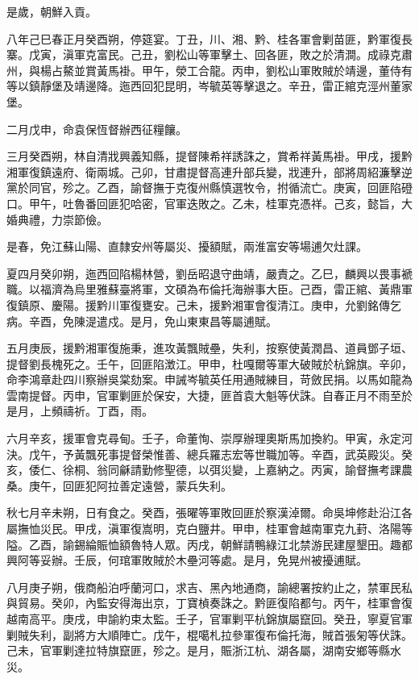 \begin{pinyinscope}
是歲，朝鮮入貢。

八年己巳春正月癸酉朔，停筵宴。丁丑，川、湘、黔、桂各軍會剿苗匪，黔軍復長寨。戊寅，滇軍克富民。己丑，劉松山等軍擊土、回各匪，敗之於清澗。成祿克肅州，與楊占鰲並賞黃馬褂。甲午，滎工合龍。丙申，劉松山軍敗賊於靖邊，董侍有等以鎮靜堡及靖邊降。迤西回犯昆明，岑毓英等擊退之。辛丑，雷正綰克涇州董家堡。

二月戊申，命袁保恆督辦西征糧饟。

三月癸酉朔，林自清戕興義知縣，提督陳希祥誘誅之，賞希祥黃馬褂。甲戌，援黔湘軍復鎮遠府、衛兩城。己卯，甘肅提督高連升部兵變，戕連升，部將周紹濂擊逆黨於同官，殄之。乙酉，諭督撫于克復州縣慎選牧令，拊循流亡。庚寅，回匪陷磴口。甲午，吐魯番回匪犯哈密，官軍迭敗之。乙未，桂軍克憑祥。己亥，懿旨，大婚典禮，力崇節儉。

是春，免江蘇山陽、直隸安州等屬災、擾額賦，兩淮富安等場逋欠灶課。

夏四月癸卯朔，迤西回陷楊林營，劉岳昭退守曲靖，嚴責之。乙巳，麟興以畏事褫職。以福濟為烏里雅蘇臺將軍，文碩為布倫托海辦事大臣。己酉，雷正綰、黃鼎軍復鎮原、慶陽。援黔川軍復甕安。己未，援黔湘軍會復清江。庚申，允劉銘傳乞病。辛酉，免陳湜遣戍。是月，免山東東昌等屬逋賦。

五月庚辰，援黔湘軍復施秉，進攻黃飄賊壘，失利，按察使黃潤昌、道員鄧子垣、提督劉長槐死之。壬午，回匪陷澂江。甲申，杜嘎爾等軍大破賊於杭錦旗。辛卯，命李鴻章赴四川察辦吳棠劾案。申誡岑毓英任用通賊練目，苛斂民捐。以馬如龍為雲南提督。丙申，官軍剿匪於保安，大捷，匪首袁大魁等伏誅。自春正月不雨至於是月，上頻禱祈。丁酉，雨。

六月辛亥，援軍會克尋甸。壬子，命董恂、崇厚辦理奧斯馬加換約。甲寅，永定河決。戊午，予黃飄死事提督榮惟善、總兵羅志宏等世職加等。辛酉，武英殿災。癸亥，倭仁、徐桐、翁同龢請勤修聖德，以弭災變，上嘉納之。丙寅，諭督撫考課農桑。庚午，回匪犯阿拉善定遠營，蒙兵失利。

秋七月辛未朔，日有食之。癸酉，張曜等軍敗回匪於察漢淖爾。命吳坤修赴沿江各屬撫恤災民。甲戌，滇軍復嵩明，克白鹽井。甲申，桂軍會越南軍克九葑、洛陽等隘。乙酉，諭錫綸賑恤額魯特人眾。丙戌，朝鮮請鴨綠江北禁游民建屋墾田。趣都興阿等妥辦。壬辰，何琯軍敗賊於木壘河等處。是月，免晃州被擾逋賦。

八月庚子朔，俄商船泊呼蘭河口，求吉、黑內地通商，諭總署按約止之，禁軍民私與貿易。癸卯，內監安得海出京，丁寶楨奏誅之。黔匪復陷都勻。丙午，桂軍會復越南高平。庚戌，申諭約束太監。壬子，官軍剿平杭錦旗屬竄回。癸丑，寧夏官軍剿賊失利，副將方大順陣亡。戊午，棍噶札拉參軍復布倫托海，賊首張匊等伏誅。己未，官軍剿達拉特旗竄匪，殄之。是月，賑浙江杭、湖各屬，湖南安鄉等縣水災。


\end{pinyinscope}
